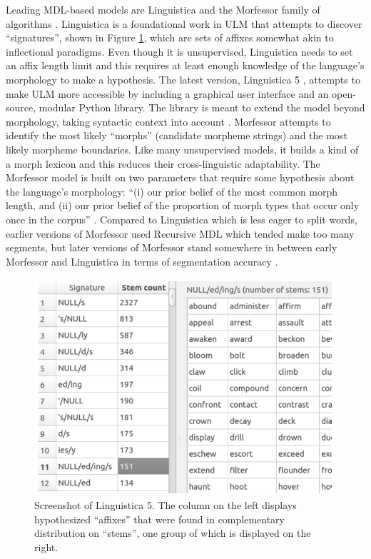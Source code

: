 \documentclass[12pt]{article}
\newcommand{\note}[4][]{\todo[author=#2,color=#3,size=\scriptsize,fancyline,caption={},#1]{#4}}
\newcommand{\mans}[2][]{\note[#1]{MH}{blue!40}{#2}{}}
\begin{document}
Leading MDL-based models are Linguistica \cite{goldsmith_linguistica:_2000,goldsmith_unsupervised_2001} and the Morfessor family of algorithms \cite{creutz_unsupervised_2005a,creutz_unsupervised_2007}. Linguistica is a foundational work in ULM that attempts to discover “signatures”, shown in Figure \ref{fig:signatures}, which are sets of affixes somewhat akin to inflectional paradigms. Even though it is unsupervised, Linguistica needs to set an affix length limit and this requires at least enough knowledge of the language’s morphology to make a hypothesis. The latest version, Linguistica 5 \cite{lee_linguistica_2016}, attempts to make ULM more accessible by including a graphical user interface and an open-source, modular Python library. The library is meant to extend the model beyond morphology, taking syntactic context into account \cite{nicolai_morphological_2017}. Morfessor \cite{creutz_unsupervised_2005a,creutz_inducing_2005b,creutz_unsupervised_2007} attempts to identify the most likely ``morphs'' (candidate morpheme strings) and the most likely morpheme boundaries. Like many unsupervised models, it builds a kind of a morph lexicon and this reduces their cross-linguistic adaptability.\mans{Why?} The Morfessor model is built on two parameters that require some hypothesis about the language's morphology: ``(i) our prior belief of the most common morph length, and (ii) our prior belief of the proportion of morph types that occur only once in the corpus'' \cite[page 281]{creutz_unsupervised_2003}. Compared to Linguistica which is less eager to split words, earlier versions of Morfessor used Recursive MDL which tended make too many segments, but later versions of Morfessor stand somewhere in between early Morfessor and Linguistica in terms of segmentation accuracy \cite{creutz_unsupervised_2003}. 

\begin{figure}[ht]
\label{fig:signatures}
\begin{center}
\includegraphics[width=0.5\columnwidth]{Linguistica5-signatures.PNG}
\caption{Screenshot of Linguistica 5. The column on the left displays hypothesized ``affixes'' that were found in complementary distribution on ``stems'', one group of which is displayed on the right.}
\end{center}
\end{figure}
\end{document}
